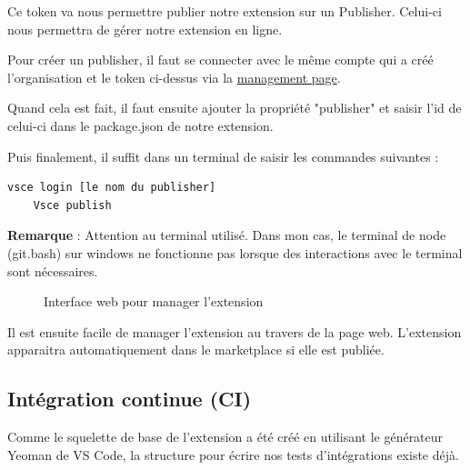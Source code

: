 \documentclass[
    iict, %
    il, %
]{heig-tb}
\begin{document}
Ce token va nous permettre publier notre extension sur un Publisher. Celui-ci nous permettra de gérer notre extension en ligne.

Pour créer un publisher, il faut se connecter avec le même compte qui a créé l'organisation et le token ci-dessus via la \href{https://marketplace.visualstudio.com/manage/publishers/}{management page}.

Quand cela est fait, il faut ensuite ajouter la propriété "publisher" et saisir l'id de celui-ci dans le package.json de notre extension.

Puis finalement, il suffit dans un terminal de saisir les commandes suivantes :
\begin{lstlisting}[frame=single]
    vsce login [le nom du publisher]
    Vsce publish
\end{lstlisting}

\textbf{Remarque} : Attention au terminal utilisé. Dans mon cas, le terminal de node (git.bash) sur windows ne fonctionne pas lorsque des interactions avec le terminal sont nécessaires.

\begin{figure}[!h]
    \begin{center}
    \end{center}
    \caption[Interface web pour manager l'extension]{\label{manage-publisher} Interface web pour manager l'extension}
\end{figure}

Il est ensuite facile de manager l'extension au travers de la page web.
L'extension apparaitra automatiquement dans le marketplace si elle est publiée.

\subsection{Intégration continue (CI)}

Comme le squelette de base de l'extension a été créé en utilisant le générateur Yeoman de VS Code, la structure pour écrire nos tests d'intégrations
existe déjà.
\end{document}
